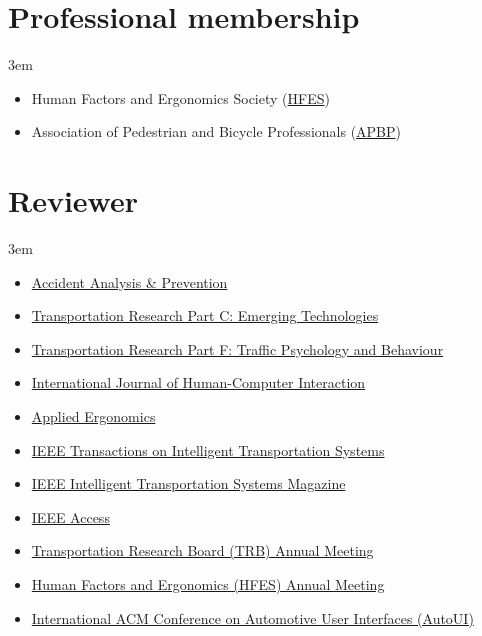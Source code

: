 \documentclass[11pt]{article}
\newenvironment{main}
{\begin{adjustwidth}{3em}{}}
{\end{adjustwidth}}
\begin{document}
\section*{Professional membership}
\begin{main}

\begin{itemize}
    \item Human Factors and Ergonomics Society (\href{https://www.hfes.org/}{HFES})
    \item Association of Pedestrian and Bicycle Professionals (\href{https://www.apbp.org/}{APBP})
\end{itemize}


\end{main}
\section*{Reviewer}
\begin{main}

\begin{itemize}
    \item \href{https://www.journals.elsevier.com/accident-analysis-and-prevention}{Accident Analysis \& Prevention}
    \item \href{https://www.journals.elsevier.com/transportation-research-part-c-emerging-technologies}{Transportation Research Part C: Emerging Technologies}
    \item \href{https://www.journals.elsevier.com/transportation-research-part-f-traffic-psychology-and-behaviour}{Transportation Research Part F: Traffic Psychology and Behaviour}
    \item \href{https://www.tandfonline.com/toc/hihc20/current}{International Journal of Human-Computer Interaction}
    \item \href{https://www.journals.elsevier.com/applied-ergonomics}{Applied Ergonomics}
    \item \href{https://ieeexplore.ieee.org/xpl/RecentIssue.jsp?punumber=6979}{IEEE Transactions on Intelligent Transportation Systems}
    \item \href{https://ieeexplore.ieee.org/xpl/RecentIssue.jsp?punumber=5117645}{IEEE Intelligent Transportation Systems Magazine}
    \item \href{https://ieeexplore.ieee.org/xpl/RecentIssue.jsp?punumber=6287639}{IEEE Access}
    \item \href{http://www.trb.org/AnnualMeeting/}{Transportation Research Board (TRB) Annual Meeting}
    \item \href{www.hfes.org}{Human Factors and Ergonomics (HFES) Annual Meeting}
    \item \href{www.auto-ui.org}{International ACM Conference on Automotive User Interfaces (AutoUI)}
\end{itemize}


\end{main}
\end{document}
